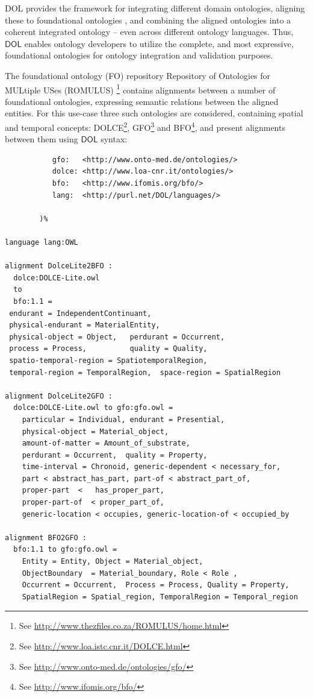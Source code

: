\documentclass[10pt, a4paper]{isov2}
\newcommand*{\DOL}{\ensuremath{\mathsf{DOL}}\xspace}
\begin{document}
DOL  provides the framework for integrating different domain ontologies, aligning these to
foundational ontologies \cite{DBLP:books/daglib/0032976},\cite{AlignmentAPI} and combining the aligned ontologies into a coherent
integrated ontology -- even across different ontology languages. Thus, \DOL  enables ontology
developers to utilize the complete, and most expressive, foundational ontologies for ontology
integration and validation purposes.

The foundational ontology (FO) repository Repository of Ontologies for MULtiple USes (ROMULUS) \footnote{See  \url{http://www.thezfiles.co.za/ROMULUS/home.html}}
contains alignments between a number of foundational ontologies, expressing semantic relations between the aligned
entities.  For this use-case three such ontologies are considered, containing spatial and temporal concepts: DOLCE\footnote{See \url{http://www.loa.istc.cnr.it/DOLCE.html}}, GFO\footnote{See \url{http://www.onto-med.de/ontologies/gfo/}} and BFO\footnote{See \url{http://www.ifomis.org/bfo/}}, and present alignments between them
using \DOL syntax:

\begin{lstlisting}[basicstyle=\ttfamily\footnotesize,language=dolText,escapechar=@,mathescape]
%prefix(
           gfo:   <http://www.onto-med.de/ontologies/>
           dolce: <http://www.loa-cnr.it/ontologies/>
           bfo:   <http://www.ifomis.org/bfo/>
           lang:  <http://purl.net/DOL/languages/>

        )%

language lang:OWL

alignment DolceLite2BFO :
  dolce:DOLCE-Lite.owl
  to
  bfo:1.1 =
 endurant = IndependentContinuant,
 physical-endurant = MaterialEntity,
 physical-object = Object,   perdurant = Occurrent,
 process = Process,          quality = Quality,
 spatio-temporal-region = SpatiotemporalRegion,
 temporal-region = TemporalRegion,  space-region = SpatialRegion

alignment DolceLite2GFO :
  dolce:DOLCE-Lite.owl to gfo:gfo.owl =
 	particular = Individual, endurant = Presential,
 	physical-object = Material_object, 
	amount-of-matter = Amount_of_substrate,
 	perdurant = Occurrent, 	quality = Property,
 	time-interval = Chronoid, generic-dependent < necessary_for,
 	part < abstract_has_part, part-of < abstract_part_of,
 	proper-part  <	 has_proper_part,  
	proper-part-of  < proper_part_of,
 	generic-location < occupies, generic-location-of < occupied_by

alignment BFO2GFO :
  bfo:1.1 to gfo:gfo.owl =
	Entity = Entity, Object = Material_object,
	ObjectBoundary  = Material_boundary, Role < Role ,
 	Occurrent = Occurrent, 	Process = Process, Quality = Property,
 	SpatialRegion = Spatial_region, TemporalRegion = Temporal_region
\end{lstlisting}
\end{document}
